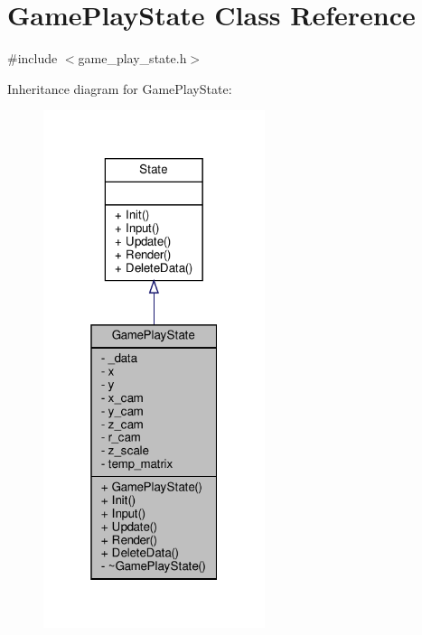 \hypertarget{classGamePlayState}{}\section{Game\+Play\+State Class Reference}
\label{classGamePlayState}


{\ttfamily \#include $<$game\+\_\+play\+\_\+state.\+h$>$}



Inheritance diagram for Game\+Play\+State\+:
\nopagebreak
\begin{figure}[H]
\begin{center}
\leavevmode
\includegraphics[width=184pt]{classGamePlayState__inherit__graph}
\end{center}
\end{figure}


